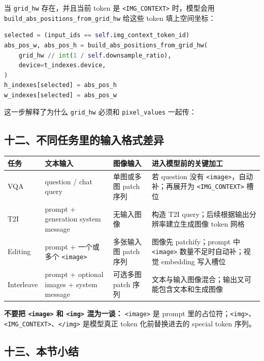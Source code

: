 当 \texttt{grid\_hw} 存在，并且当前 token 是 \texttt{<IMG\_CONTEXT>} 时，模型会用 \texttt{build\_abs\_positions\_from\_grid\_hw} 给这些 token 填上空间坐标：

\begin{lstlisting}[language=Python]
selected = (input_ids == self.img_context_token_id)
abs_pos_w, abs_pos_h = build_abs_positions_from_grid_hw(
    grid_hw // int(1 / self.downsample_ratio),
    device=t_indexes.device,
)
h_indexes[selected] = abs_pos_h
w_indexes[selected] = abs_pos_w
\end{lstlisting}

这一步解释了为什么 \texttt{grid\_hw} 必须和 \texttt{pixel\_values} 一起传：

\subsection{十二、不同任务里的输入格式差异}

\begin{center}
{\small
\begin{tabular}{p{2.6cm}p{3.2cm}p{3.8cm}p{4.4cm}}
\hline
\textbf{任务} & \textbf{文本输入} & \textbf{图像输入} & \textbf{进入模型前的关键加工} \\
\hline
VQA & question / chat query & 单图或多图 patch 序列 & 若 question 没有 \texttt{<image>}，自动补；再展开为 \texttt{<IMG\_CONTEXT>} 槽位 \\
T2I & prompt + generation system message & 无输入图像 & 构造 T2I query；后续根据输出分辨率建立生成图像 token 网格 \\
Editing & prompt + 一个或多个 \texttt{<image>} & 多张输入图 patch 序列 & 图像先 patchify；prompt 中 \texttt{<image>} 数量不足时自动补；视觉 embedding 写入槽位 \\
Interleave & prompt + optional images + system message & 可选多图 patch 序列 & 文本与输入图像混合；输出又可能包含文本和生成图像 \\
\hline
\end{tabular}
}
\end{center}

\begin{warnbox}
\textbf{不要把 \texttt{<image>} 和 \texttt{<img>} 混为一谈：} \texttt{<image>} 是 prompt 里的占位符；\texttt{<img>}、\texttt{<IMG\_CONTEXT>}、\texttt{</img>} 是模型真正 token 化前替换进去的 special token 序列。
\end{warnbox}

\subsection{十三、本节小结}


